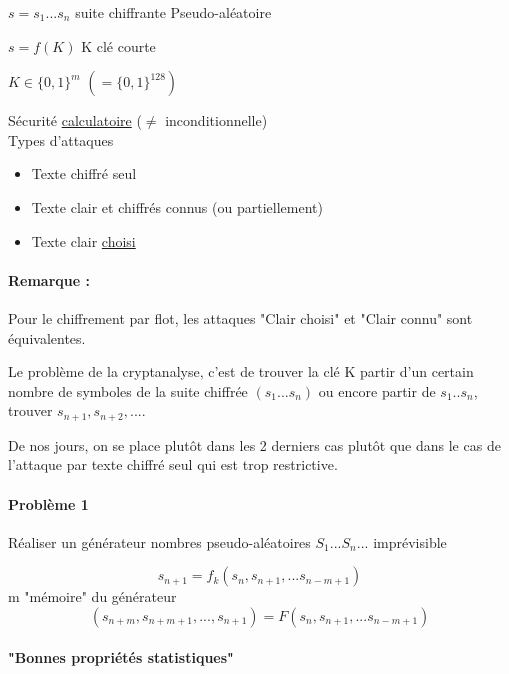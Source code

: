 \documentclass[12pt,a4paper]{article}
\begin{document}
$s = s_1 ... s_n$ suite chiffrante Pseudo-aléatoire

$s = f(K)$\hspace{1cm} K clé courte

\hspace{2.8cm}$ K \in \{0,1\}^m$  $(=\{0,1\}^{128})$

Sécurité \underline{calculatoire} ($\neq$ inconditionnelle)\\

Types d'attaques
\begin{itemize}
\item Texte chiffré seul
\item Texte clair et chiffrés connus (ou partiellement)
\item Texte clair \underline{choisi}
\end{itemize}

\paragraph{Remarque :}
	Pour le chiffrement par flot, les attaques "Clair choisi" et "Clair connu" sont équivalentes.
	
	Le problème de la cryptanalyse, c'est de trouver la clé K  partir d'un certain nombre de symboles de la suite chiffrée $(s_1 ... s_n)$ ou encore  partir de $s_1..s_n$, trouver $s_{n+1},s_{n+2},...$. 
	
	De nos jours, on se place plutôt dans les 2 derniers cas plutôt que dans le cas de l'attaque par texte chiffré seul qui est trop restrictive.

\paragraph{Problème 1}
	Réaliser un générateur nombres pseudo-aléatoires
	$S_1...S_n...$ imprévisible
	
	\begin{displaymath}
	s_{n+1}=f_k(s_{n},s_{n+1},...s_{n-m+1})
	\end{displaymath}
	m "mémoire" du générateur
	\begin{displaymath}
	(s_{n+m},s_{n+m+1},...,s_{n+1})=F(s_{n},s_{n+1},...s_{n-m+1})
	\end{displaymath}
	
\paragraph{"Bonnes propriétés statistiques"}
\end{document}
